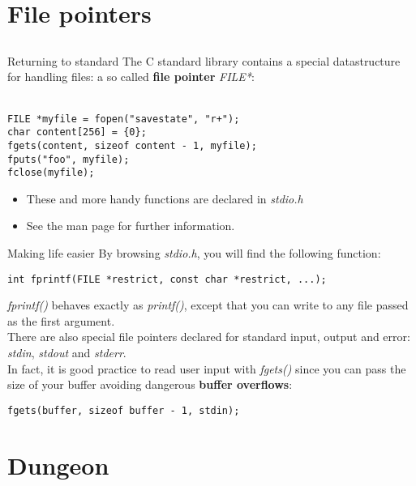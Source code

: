 \section{File pointers}
\subsection{}

\begin{frame}[fragile]{Returning to standard}
	The C standard library contains a special datastructure for handling files: a so called \textbf{file pointer} \textit{FILE*}:\\\ \\
	
	\begin{lstlisting}
FILE *myfile = fopen("savestate", "r+");
char content[256] = {0};
fgets(content, sizeof content - 1, myfile);
fputs("foo", myfile);
fclose(myfile);
\end{lstlisting}\bigskip

	\begin{itemize}
		\item These and more handy functions are declared in \textit{stdio.h}
		\item See the man page for further information.
	\end{itemize}
\end{frame}

\begin{frame}[fragile]{Making life easier}
	By browsing \textit{stdio.h}, you will find the following function:
	\begin{lstlisting}
int fprintf(FILE *restrict, const char *restrict, ...);
\end{lstlisting}
	\textit{fprintf()} behaves exactly as \textit{printf()}, except that you can write to any file passed as the first argument.\\ \bigskip
	There are also special file pointers declared for standard input, output and error:
	\textit{stdin}, \textit{stdout} and \textit{stderr}.\\ \bigskip
	In fact, it is good practice to read user input with \textit{fgets()} since you can pass the size of your buffer avoiding dangerous \textbf{buffer overflows}:
	\begin{lstlisting}
fgets(buffer, sizeof buffer - 1, stdin);
\end{lstlisting}
\end{frame}

\section{Dungeon}
